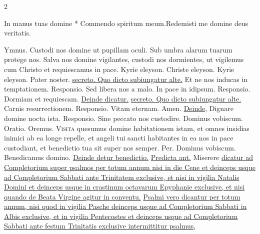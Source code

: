 \begin{multicols*}{2}
\begin{responsory-breve}
{In manus tuas domine * Commendo spiritum meum.}{Redemisti me domine deus veritatis.}
\end{responsory-breve}%
{\color{Red} Ymnus.}
\newline \V Custodi nos domine ut pupillam oculi.
\newline \R Sub umbra alarum tuarum protege nos.
 Salva nos domine vigilantes, custodi nos dormientes, ut vigilemus cum Christo et requiescamus in pace.
\newline Kyrie eleyson. Christe eleyson. Kyrie eleyson. Pater noster. \ul{secreto. Quo dicto subiungatur alte.} Et ne nos inducas in temptationem. {\color{Red} Responsio.} Sed libera nos a malo. \V In pace in idipsum. {\color{Red} Responsio.} Dormiam et requiescam. \ul{Deinde dicatur.}  \ul{secreto. Quo dicto subiungatur alte.} Carnis resurrectionem. {\color{Red} Responsio.} Vitam eternam. Amen. \ul{Deinde,} Dignare domine nocta ista. {\color{Red} Responsio.} Sine peccato nos custodire. Dominus vobiscum. {\color{Red} Oratio.} Oremus.
\lettrine[lines=2]{\zallmancaps \color{Blue} V}{isita} \hypertarget{visita-quesumus}{quesumus} domine habitationem istam, et omnes insidias inimici ab ea longe repelle, et angeli tui sancti habitantes in ea nos in pace custodiant, et benedictio tua sit super nos semper. Per. Dominus vobiscum. Benedicamus domino. \ul{Deinde detur benedictio.}
\newline \ul{Predicta ant.} Miserere \ul{dicatur ad Completorium super psalmos per totum annum nisi in die Cene et deinceps usque ad Completorium Sabbati ante Trinitatem exclusive, et nisi in vigilia Natalis Domini et deinceps usque in crastinum octavarum Epyphanie exclusive, et nisi quando de Beata Virgine agitur in conventu.}
\newline \ul{Psalmi vero dicantur per totum annum, nisi quod in vigilia Pasche deinceps usque ad Completorium Sabbati in Albis exclusive, et in vigilia Pentecostes et deinceps usque ad Completorium Sabbati ante festum Trinitatis exclusive intermittitur psalmus,} 

\end{multicols*}
